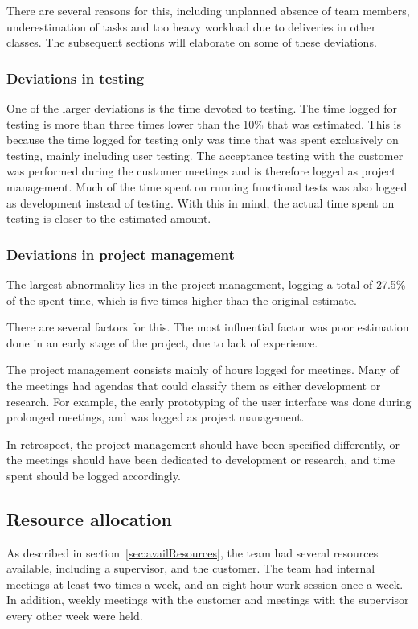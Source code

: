 There are several reasons for this, including unplanned absence of team members, underestimation of tasks and too heavy workload due to deliveries in other classes. The subsequent sections will elaborate on some of these deviations.

\subsubsection{Deviations in testing}
One of the larger deviations is the time devoted to testing. The time logged for testing is more than three times lower than the 10\% that was estimated. This is because the time logged for testing only was time that was spent exclusively on testing, mainly including user testing. The acceptance testing with the customer was performed during the customer meetings and is therefore logged as project management. Much of the time spent on running functional tests was also logged as development instead of testing. With this in mind, the actual time spent on testing is closer to the estimated amount.

\subsubsection{Deviations in project management}
The largest abnormality lies in the project management, logging a total of 27.5\% of the spent time, which is five times higher than the original estimate. 

There are several factors for this. The most influential factor was poor estimation done in an early stage of the project, due to lack of experience. 

The project management consists mainly of hours logged for meetings. Many of the meetings had agendas that could classify them as either development or research. For example, the early prototyping of the user interface was done during prolonged meetings, and was logged as project management. 

In retrospect, the project management should have been specified differently, or the meetings should have been dedicated to development or research, and time spent should be logged accordingly.

\subsection{Resource allocation}
As described in section~\ref{sec:availResources}, the team had several resources available, including a supervisor, and the customer. The team had internal meetings at least two times a week, and an eight hour work session once a week. In addition, weekly meetings with the customer and meetings with the supervisor every other week were held.

